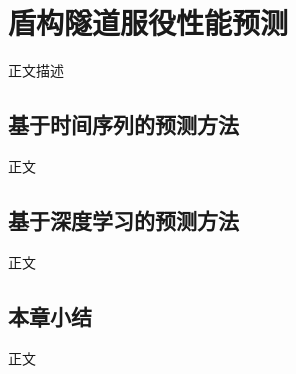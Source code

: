 \chapter{盾构隧道服役性能预测}
\label{chap:prediction}

正文描述

\section{基于时间序列的预测方法}

正文




\section{基于深度学习的预测方法}

正文




\section{本章小结}

正文